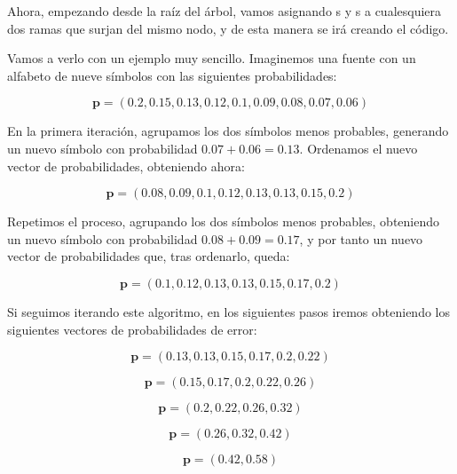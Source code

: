 \documentclass[es,apuntes]{uah}
\begin{document}
Ahora, empezando desde la raíz del árbol, vamos asignando s y s a cualesquiera dos ramas que surjan del mismo nodo, y de esta manera se irá creando el código. 

Vamos a verlo con un ejemplo muy sencillo. Imaginemos una fuente con un alfabeto de nueve símbolos con las siguientes probabilidades: 

\begin{displaymath}
\mathbf{p} = (0.2, 0.15, 0.13, 0.12, 0.1, 0.09, 0.08, 0.07, 0.06)
\end{displaymath}

En la primera iteración, agrupamos los dos símbolos menos probables, generando un nuevo símbolo con probabilidad $0.07 + 0.06 = 0.13$. Ordenamos el nuevo vector de probabilidades, obteniendo ahora:

\begin{displaymath}
	\mathbf{p} = (0.08, 0.09, 0.1, 0.12, 0.13, 0.13, 0.15, 0.2)
\end{displaymath}

Repetimos el proceso, agrupando los dos símbolos menos probables, obteniendo un nuevo símbolo con probabilidad $0.08 + 0.09 = 0.17$, y por tanto un nuevo vector de probabilidades que, tras ordenarlo, queda:

\begin{displaymath}
	\mathbf{p} = (0.1, 0.12, 0.13, 0.13, 0.15, 0.17, 0.2)
\end{displaymath}

Si seguimos iterando este algoritmo, en los siguientes pasos iremos obteniendo los siguientes vectores de probabilidades de error:

\begin{displaymath}
	\mathbf{p} = (0.13, 0.13, 0.15, 0.17, 0.2, 0.22)
\end{displaymath}

\begin{displaymath}
	\mathbf{p} = (0.15, 0.17, 0.2, 0.22, 0.26)
\end{displaymath}

\begin{displaymath}
	\mathbf{p} = (0.2, 0.22, 0.26, 0.32)
\end{displaymath}

\begin{displaymath}
	\mathbf{p} = (0.26, 0.32, 0.42)
\end{displaymath}

\begin{displaymath}
	\mathbf{p} = (0.42, 0.58)
\end{displaymath}
\end{document}

